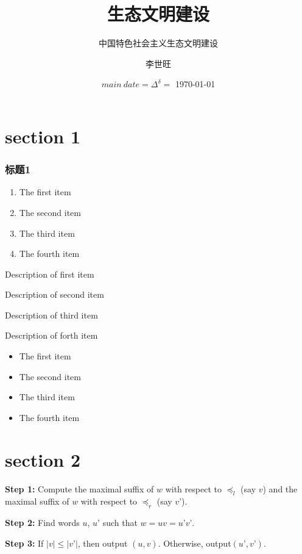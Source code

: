 \documentclass{beamer}
\begin{document}
\title{生态文明建设}
\subtitle{中国特色社会主义生态文明建设}
\author[1307402068李世旺]{李世旺}
\date{$main~date = \Delta^\delta = $ \today}
\section{section 1}
\begin{frame}\frametitle{标题1}
	\begin{enumerate}
\item The first item
\item The second item
\item The third item
\item The fourth item
	\end{enumerate}
\end{frame}
\begin{frame}
	\begin{description}
\item[First Item] Description of first item
\item[Second Item] Description of second item
\item[Third Item] Description of third item
\item[Forth Item] Description of forth item
	\end{description}
\end{frame}
\begin{frame}
	\begin{itemize}
\item The first item
\item The second item
\item The third item
\item The fourth item
	\end{itemize}
\end{frame}
\section{section 2}
\begin{frame}

\textbf{Step 1:} Compute the maximal suffix of $w$
with respect to $\preceq_l$ (say $v$) and the
maximal suffix of $w$ with respect to $\preceq_r$
(say $v’$).
\pause

\textbf{Step 2:} Find words $u$, $u’$ such that
$w = uv = u’v’$.
\pause

\textbf{Step 3:} If $|v| \le |v’|$, then output
$(u,v)$. Otherwise, output$(u’,v’)$.
\end{frame}
\end{document}
